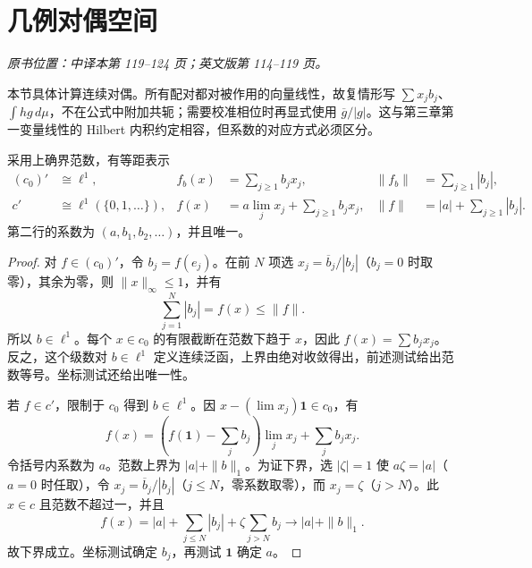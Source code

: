 \section{几例对偶空间}\label{sec:yosida-04-09}
\noindent\textit{原书位置：中译本第 119--124 页；英文版第 114--119 页。}

本节具体计算连续对偶。所有配对都对被作用的向量线性，故复情形写 $\sum x_jb_j$、$\int hg\,d\mu$，不在公式中附加共轭；需要校准相位时再显式使用 $\overline g/|g|$。这与第三章第一变量线性的 Hilbert 内积约定相容，但系数的对应方式必须区分。

\begin{theorem}[零收敛序列与收敛序列的对偶]\label{thm:y4-c0-c-dual}
采用上确界范数，有等距表示
\[
 \begin{aligned}
 (c_0)'&\cong\ell^1,& f_b(x)&=\sum_{j\ge1}b_jx_j,
 &\|f_b\|&=\sum_{j\ge1}|b_j|,\\
 c'&\cong\ell^1(\{0,1,\ldots\}),& f(x)&=a\lim_jx_j+\sum_{j\ge1}b_jx_j,
 &\|f\|&=|a|+\sum_{j\ge1}|b_j|.
 \end{aligned}
\]
第二行的系数为 $(a,b_1,b_2,\ldots)$，并且唯一。
\end{theorem}
\begin{proof}
对 $f\in(c_0)'$，令 $b_j=f(e_j)$。在前 $N$ 项选 $x_j=\overline b_j/|b_j|$（$b_j=0$ 时取零），其余为零，则 $\|x\|_\infty\le1$，并有
\[
 \sum_{j=1}^N|b_j|=f(x)\le\|f\|.
\]
所以 $b\in\ell^1$。每个 $x\in c_0$ 的有限截断在范数下趋于 $x$，因此 $f(x)=\sum b_jx_j$。反之，这个级数对 $b\in\ell^1$ 定义连续泛函，上界由绝对收敛得出，前述测试给出范数等号。坐标测试还给出唯一性。

若 $f\in c'$，限制于 $c_0$ 得到 $b\in\ell^1$。因 $x-(\lim x_j)\mathbf1\in c_0$，有
\[
 f(x)=\left(f(\mathbf1)-\sum_jb_j\right)\lim_jx_j+\sum_jb_jx_j.
\]
令括号内系数为 $a$。范数上界为 $|a|+\|b\|_1$。为证下界，选 $|\zeta|=1$ 使 $a\zeta=|a|$（$a=0$ 时任取），令 $x_j=\overline b_j/|b_j|$（$j\le N$，零系数取零），而 $x_j=\zeta$（$j>N$）。此 $x\in c$ 且范数不超过一，并且
\[
 f(x)=|a|+\sum_{j\le N}|b_j|+\zeta\sum_{j>N}b_j
 \longrightarrow |a|+\|b\|_1.
\]
故下界成立。坐标测试确定 $b_j$，再测试 $\mathbf1$ 确定 $a$。
\end{proof}

